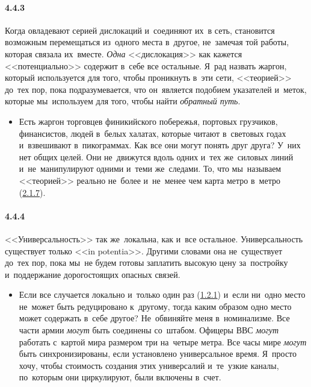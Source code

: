 \paragraph{4.4.3}\hypertarget{par:4.4.3}{} Когда овладевают серией дислокаций и~соединяют их~в сеть, становится возможным перемещаться из~одного места в~другое, не~замечая той работы, которая связала их~вместе. {\itshape Одна} <<дислокация>> как кажется <<потенциально>> содержит в~себе все остальные. Я~рад назвать жаргон, который используется для того, чтобы проникнуть в~эти сети, <<теорией>> до~тех пор, пока подразумевается, что он~является подобием указателей и~меток, которые мы~используем для того, чтобы найти {\itshape обратный путь}.
	\begin{itemize}
	\item 
	Есть жаргон торговцев финикийского побережья, портовых грузчиков, финансистов, людей в~белых халатах, которые читают в~световых годах и~взвешивают в~пикограммах. Как все они могут понять друг друга? У~них нет общих целей. Они не~движутся вдоль одних и~тех же~силовых линий и~не~манипулируют одними и~теми же~следами. То, что мы~называем <<теорией>> реально не~более и~не~менее чем карта метро в~метро (\hyperlink{par:2.1.7}{2.1.7}).
	\end{itemize}	


\paragraph{4.4.4}\hypertarget{par:4.4.4}{} <<Универсальность>> так же~локальна, как и~все остальное. Универсальность существует только <<in potentia>>. Другими словами она не~существует до~тех пор, пока мы~не будем готовы заплатить высокую цену за~постройку и~поддержание дорогостоящих опасных связей. 
	\begin{itemize}
	\item 
	Если все случается локально и~только один раз (\hyperlink{par:1.2.1}{1.2.1}) и~если ни~одно место не~может быть редуцировано к~другому, тогда каким образом одно место может содержать в~себе другое? Не~обвиняйте меня в~номинализме. Все части армии {\itshape могут} быть соединены со~штабом. Офицеры ВВС {\itshape могут} работать с~картой мира размером три на~четыре метра. Все часы мире {\itshape могут} быть синхронизированы, если установлено универсальное время. Я~просто хочу, чтобы стоимость создания этих универсалий и~те~узкие каналы, по~которым они циркулируют, были включены в~счет.
	\end{itemize}	


